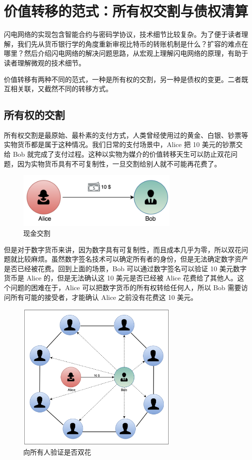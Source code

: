 \section{价值转移的范式：所有权交割与债权清算}
闪电网络的实现包含智能合约与密码学协议，技术细节比较复杂。为了便于读者理解，我们先从货币银行学的角度重新审视比特币的转账机制是什么？扩容的难点在哪里？然后介绍闪电网络的解决问题思路，从宏观上理解闪电网络的原理，有助于读者理解微观的技术细节。

价值转移有两种不同的范式，一种是所有权的交割，另一种是债权的变更。二者既互相关联，又截然不同的转移方式。

\subsection{所有权的交割}
所有权交割是最原始、最朴素的支付方式，人类曾经使用过的黄金、白银、钞票等实物货币都是属于这种情况。我们日常的支付场景中，Alice 把 10 美元的钞票交给 Bob 就完成了支付过程。这种以实物为媒介的价值转移天生可以防止双花问题，因为实物货币具有不可复制性，一旦交割给别人就不可能再花费了。

\begin{figure}[h!]
    \centering
	\includegraphics[width=8cm, keepaspectratio]{../images/cash.png}
    \caption{现金交割}
    \label{fig:cash}
\end{figure}

但是对于数字货币来讲，因为数字具有可复制性，而且成本几乎为零，所以双花问题就比较麻烦。虽然数字签名技术可以确定所有者的身份，但是无法确定数字资产是否已经被花费。回到上面的场景，Bob 可以通过数字签名可以验证 10 美元数字货币是 Alice 的，但是无法确认这 10 美元是否已经被 Alice 花费给了其他人。这个问题的困难在于，Alice 可以把数字货币的所有权转给任何人，所以 Bob 需要访问所有可能的接受者，才能确认 Alice 之前没有花费这 10 美元。

\begin{figure}[h!]
    \centering
    \includegraphics[width=8cm, keepaspectratio]{../images/Gossip_1.png}
    \caption{向所有人验证是否双花}
    \label{fig:gossip}
\end{figure}

